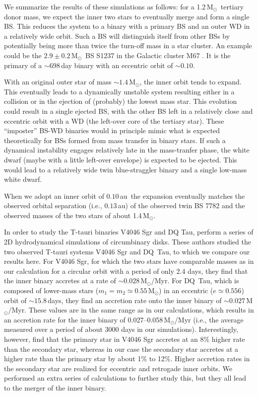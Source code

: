 \documentclass[twocolumn]{aastex62}
\newcommand{\MSun}{\mbox{M$_\odot$}}
\begin{document}
We summarize the results of these simulations as follows: for a
1.2\,\MSun\, tertiary donor mass, we expect the inner two stars to
eventually merge and form a single BS. This reduces the system to a
binary with a primary BS and an outer WD in a relatively wide
orbit. Such a BS will distinguish itself from other BSs by potentially
being more than twice the turn-off mass in a star cluster.  An example
could be the $2.9\pm0.2$\,\MSun\, BS S1237 in the Galactic cluster M67
\citep{2016ApJ...832L..13L}. It is the primary of a $\sim 698$\,day
binary with an eccentric orbit of $\sim 0.10$.

With an original outer star of mass $\sim 1.4$\,\MSun, the inner orbit
tends to expand. This eventually leads to a dynamically unstable
system resulting either in a collision or in the ejection of
(probably) the lowest mass star. This evolution could result in a
single ejected BS, with the other BS left in a relatively close and
eccentric orbit with a WD (the left-over core of the tertiary star).
These ``imposter'' BS-WD binaries would in principle mimic what is
expected theoretically for BSs formed from mass transfer in binary
stars. If such a dynamical instability engages relatively late in the
mass-tranfer phase, the white dwarf (maybe with a little left-over
envelope) is expected to be ejected. This would lead to a relatively
wide twin blue-straggler binary and a single low-mass white dwarf.

When we adopt an inner orbit of $0.10$\,au\, the expansion eventually
matches the observed orbital separation (i.e., $0.13$\,au) of the
observed twin BS 7782 and the observed masses of the two stars of
about 1.4\,\MSun.

In order to study the T-tauri binaries V4046 Sgr and DQ Tau,
\cite{2011MNRAS.413.2679D} perform a series of 2D hydrodynamical
simulations of circumbinary disks.  These authors studied the two
observed T-tauri systems V4046 Sgr and DQ~Tau, to which we compare our
results here.  For V4046 Sgr, for which the two stars have comparable
masses as in our calculation for a circular orbit with a period of
only 2.4 days, they find that the inner binary accretes at a rate of
$\sim 0.028$\,\MSun/Myr.  For DQ~Tau, which is composed of lower-mass
stars ($m_1 = m_2 \simeq 0.55$\,\MSun) in an eccentric ($e\simeq              
0.556$) orbit of $\sim 15.8$\,days, they find an accretion rate onto
the inner binary of $\sim 0.027$\,\MSun/Myr.  These values are in the
same range as in our calculations, which results in an accretion rate
for the inner binary of 0.027--0.058\,\MSun/Myr (i.e., the average
measured over a period of about 3000 days in our simulations).
Interestingly, however, \cite{2011MNRAS.413.2679D} find that the
primary star in V4046 Sgr accretes at an 8\% higher rate than the
secondary star, whereas in our case the secondary star accretes at a
higher rate than the primary star by about 1\% to 12\%.  Higher
accretion rates in the secondary star are realized for eccentric and
retrogade inner orbits. We performed an extra series of calculations
to further study this, but they all lead to the merger of the inner
binary.
\end{document}
